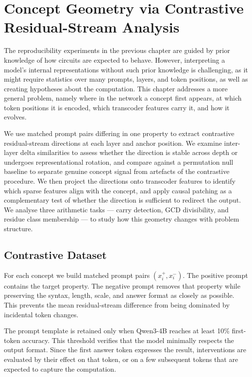 \chapter{Concept Geometry via Contrastive Residual-Stream Analysis}
\label{sec:concept_geometry}

The reproducibility experiments in the previous chapter are guided by prior
knowledge of how circuits are expected to behave. However, interpreting a 
model's internal representations without such prior knowledge is challenging, 
as it might require statistics over many prompts, layers, and token positions,
 as well as creating hypotheses about the computation.
This chapter addresses a
more general problem, namely where in the network 
a concept first appears, at which token positions it is encoded,
 which transcoder features carry it, and how it evolves.

We use matched prompt pairs differing in one property to extract contrastive
residual-stream directions at each layer and anchor position.  We examine
inter-layer delta similarities to assess whether the direction is stable
across depth or undergoes representational rotation, and compare against a
permutation null baseline to separate genuine concept signal from artefacts
of the contrastive procedure.  We then project the directions onto transcoder
features to identify which sparse features align with the concept, and apply
causal patching as a complementary test of whether the direction is sufficient
to redirect the output.  We analyse three arithmetic tasks --- carry
detection, GCD divisibility, and residue class membership --- to study how
this geometry changes with problem structure.

\section{Contrastive Dataset}
\label{sec:concept_pairs}

For each concept we build matched prompt pairs \((x_i^+,x_i^-)\). The positive
prompt contains the target property. The negative prompt removes that property
while preserving the syntax, length, scale, and answer format as closely as
possible. This prevents the mean residual-stream difference from being dominated
by incidental token changes.

The prompt template is retained only when Qwen3-4B reaches at least 10\%
first-token accuracy. This threshold verifies that the model minimally respects the
output format. Since the first answer token
expresses the result, interventions are evaluated by their effect on that token, or
on a few subsequent tokens that are expected to capture the computation.

